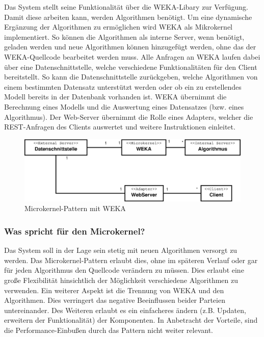 Das System stellt seine Funktionalität über die WEKA-Libary zur Verfügung. Damit diese arbeiten kann, werden Algorithmen benötigt. 
Um eine dynamische Ergänzung der Algorithmen zu ermöglichen wird WEKA als Mikrokernel implementiert. 
So können die Algorithmen als interne Server, wenn benötigt, geladen werden und neue Algorithmen können hinzugefügt werden, ohne das der WEKA-Quellcode bearbeitet werden muss. 
Alle Anfragen an WEKA laufen dabei über eine Datenschnittstelle, welche verschiedene Funktionalitäten für den Client bereitstellt.
So kann die Datenschnittstelle zurückgeben, welche Algorithmen von einem bestimmten Datensatz unterstützt werden oder ob ein zu erstellendes Modell bereits in der Datenbank vorhanden ist. 
WEKA übernimmt die Berechnung eines Modells und die Auswertung eines Datensatzes (bzw. eines Algorithmus). 
Der Web-Server übernimmt die Rolle eines Adapters, welcher die REST-Anfragen des Clients auswertet und weitere Instruktionen einleitet.\\
\begin{figure}[h]
\centering
	\vspace{-5pt}
\includegraphics[width=0.7\linewidth]{Grafik/Diagramm/Microkernel}
\caption[Microkernel-Klassen]{Microkernel-Pattern mit WEKA}
\label{fig:Microkernel}
\end{figure}

\subsubsection{Was spricht für den Microkernel?}
Das System soll in der Lage sein stetig mit neuen Algorithmen versorgt zu werden. Das Microkernel-Pattern erlaubt dies, ohne im späteren Verlauf oder gar für jeden Algorithmus den Quellcode verändern zu müssen. Dies erlaubt eine große Flexibilität hinsichtlich der Möglichkeit verschiedene Algorithmen zu verwenden. Ein weiterer Aspekt ist die Trennung von WEKA und den Algorithmen. Dies verringert das negative Beeinflussen beider Parteien untereinander. Des Weiteren erlaubt es ein einfacheres ändern (z.B. Updaten, erweitern der Funktionalität) der Komponenten. In Anbetracht der Vorteile, sind die Performance-Einbußen durch das Pattern nicht weiter relevant.